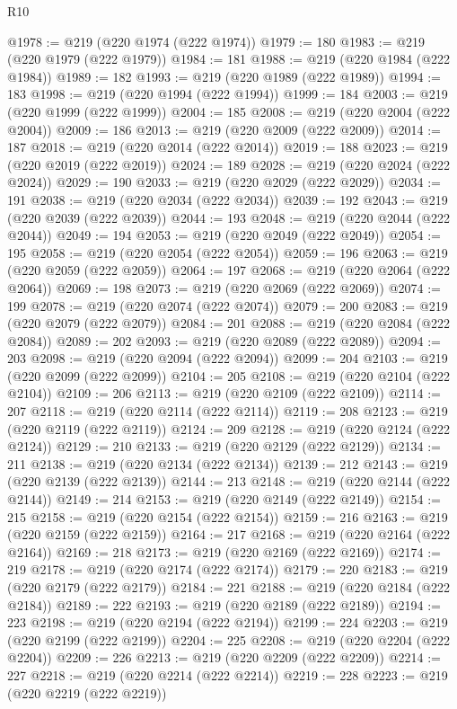 \begin{lexlean}{R10}
\begin{coremodule}
{{{{{{{{{{{{{{{{{{{{{{{{{{{{{{{{{{{{{{{{{{{{{{{{{{{{{{{{{{{{{{{{{{{{{{{{{{{{{{{{{{{{{{{{{{{{{{{{{{{{{{{{{{{{@1978 := @219 (@220 @1974 (@222 @1974))
@1979 := 180
@1983 := @219 (@220 @1979 (@222 @1979))
@1984 := 181
@1988 := @219 (@220 @1984 (@222 @1984))
@1989 := 182
@1993 := @219 (@220 @1989 (@222 @1989))
@1994 := 183
@1998 := @219 (@220 @1994 (@222 @1994))
@1999 := 184
@2003 := @219 (@220 @1999 (@222 @1999))
@2004 := 185
@2008 := @219 (@220 @2004 (@222 @2004))
@2009 := 186
@2013 := @219 (@220 @2009 (@222 @2009))
@2014 := 187
@2018 := @219 (@220 @2014 (@222 @2014))
@2019 := 188
@2023 := @219 (@220 @2019 (@222 @2019))
@2024 := 189
@2028 := @219 (@220 @2024 (@222 @2024))
@2029 := 190
@2033 := @219 (@220 @2029 (@222 @2029))
@2034 := 191
@2038 := @219 (@220 @2034 (@222 @2034))
@2039 := 192
@2043 := @219 (@220 @2039 (@222 @2039))
@2044 := 193
@2048 := @219 (@220 @2044 (@222 @2044))
@2049 := 194
@2053 := @219 (@220 @2049 (@222 @2049))
@2054 := 195
@2058 := @219 (@220 @2054 (@222 @2054))
@2059 := 196
@2063 := @219 (@220 @2059 (@222 @2059))
@2064 := 197
@2068 := @219 (@220 @2064 (@222 @2064))
@2069 := 198
@2073 := @219 (@220 @2069 (@222 @2069))
@2074 := 199
@2078 := @219 (@220 @2074 (@222 @2074))
@2079 := 200
@2083 := @219 (@220 @2079 (@222 @2079))
@2084 := 201
@2088 := @219 (@220 @2084 (@222 @2084))
@2089 := 202
@2093 := @219 (@220 @2089 (@222 @2089))
@2094 := 203
@2098 := @219 (@220 @2094 (@222 @2094))
@2099 := 204
@2103 := @219 (@220 @2099 (@222 @2099))
@2104 := 205
@2108 := @219 (@220 @2104 (@222 @2104))
@2109 := 206
@2113 := @219 (@220 @2109 (@222 @2109))
@2114 := 207
@2118 := @219 (@220 @2114 (@222 @2114))
@2119 := 208
@2123 := @219 (@220 @2119 (@222 @2119))
@2124 := 209
@2128 := @219 (@220 @2124 (@222 @2124))
@2129 := 210
@2133 := @219 (@220 @2129 (@222 @2129))
@2134 := 211
@2138 := @219 (@220 @2134 (@222 @2134))
@2139 := 212
@2143 := @219 (@220 @2139 (@222 @2139))
@2144 := 213
@2148 := @219 (@220 @2144 (@222 @2144))
@2149 := 214
@2153 := @219 (@220 @2149 (@222 @2149))
@2154 := 215
@2158 := @219 (@220 @2154 (@222 @2154))
@2159 := 216
@2163 := @219 (@220 @2159 (@222 @2159))
@2164 := 217
@2168 := @219 (@220 @2164 (@222 @2164))
@2169 := 218
@2173 := @219 (@220 @2169 (@222 @2169))
@2174 := 219
@2178 := @219 (@220 @2174 (@222 @2174))
@2179 := 220
@2183 := @219 (@220 @2179 (@222 @2179))
@2184 := 221
@2188 := @219 (@220 @2184 (@222 @2184))
@2189 := 222
@2193 := @219 (@220 @2189 (@222 @2189))
@2194 := 223
@2198 := @219 (@220 @2194 (@222 @2194))
@2199 := 224
@2203 := @219 (@220 @2199 (@222 @2199))
@2204 := 225
@2208 := @219 (@220 @2204 (@222 @2204))
@2209 := 226
@2213 := @219 (@220 @2209 (@222 @2209))
@2214 := 227
@2218 := @219 (@220 @2214 (@222 @2214))
@2219 := 228
@2223 := @219 (@220 @2219 (@222 @2219))
}}}}}}}}}}}}}}}}}}}}}}}}}}}}}}}}}}}}}}}}}}}}}}}}}}}}}}}}}}}}}}}}}}}}}}}}}}}}}}}}}}}}}}}}}}}}}}}}}}}}}}}}}}}}
\end{coremodule}
\end{lexlean}
